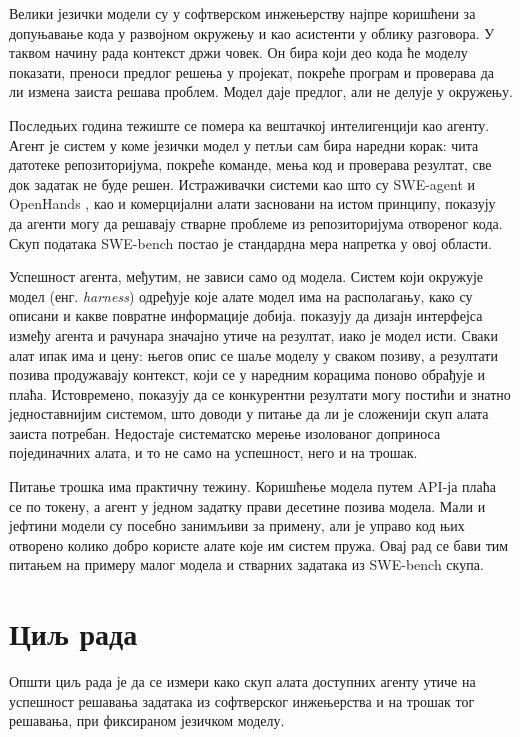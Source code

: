 \documentclass[12pt,a4paper]{report}
\begin{document}
	Велики језички модели су у софтверском инжењерству најпре коришћени за
	допуњавање кода у развојном окружењу и као асистенти у облику разговора. У таквом начину рада контекст држи човек. Он бира који део кода
	ће моделу показати, преноси предлог решења у пројекат, покреће програм и
	проверава да ли измена заиста решава проблем. Модел даје предлог, али не
	делује у окружењу.

	Последњих година тежиште се помера ка вештачкој интелигенцији као агенту.
	Агент је систем у коме језички модел у петљи сам бира наредни корак: чита
	датотеке репозиторијума, покреће команде, мења код и проверава резултат,
	све док задатак не буде решен. Истраживачки системи као што су SWE-agent
	\parencite{yang2024sweagent} и OpenHands \parencite{wang2025openhands}, као
	и комерцијални алати засновани на истом принципу, показују да агенти могу
	да решавају стварне проблеме из репозиторијума отвореног кода. Скуп података
	SWE-bench \parencite{jimenez2024swebench} постао је стандардна мера
	напретка у овој области.

	Успешност агента, међутим, не зависи само од модела. Систем који окружује
	модел (енг. \textit{harness}) одређује које алате модел има на располагању,
	како су описани и какве повратне информације добија. \textcite{yang2024sweagent}
	показују да дизајн интерфејса између агента и рачунара значајно утиче на
	резултат, иако је модел исти. Сваки алат ипак има и цену: његов опис се шаље
	моделу у сваком позиву, а резултати позива продужавају контекст, који се у
	наредним корацима поново обрађује и плаћа. Истовремено,
	\textcite{xia2025agentless} показују да се конкурентни резултати могу
	постићи и знатно једноставнијим системом, што доводи у питање да ли је
	сложенији скуп алата заиста потребан. Недостаје систематско мерење
	изолованог доприноса појединачних алата, и то не само на успешност, него и
	на трошак.

	Питање трошка има практичну тежину. Коришћење модела путем API-ја плаћа се
	по токену, а агент у једном задатку прави десетине позива модела. Мали и
	јефтини модели су посебно занимљиви за примену, али је управо код њих
	отворено колико добро користе алате које им систем пружа. Овај рад се бави
	тим питањем на примеру малог модела и стварних задатака из SWE-bench скупа.

	\section{Циљ рада}

	Општи циљ рада је да се измери како скуп алата доступних агенту утиче на
	успешност решавања задатака из софтверског инжењерства и на трошак тог
	решавања, при фиксираном језичком моделу.
\end{document}
